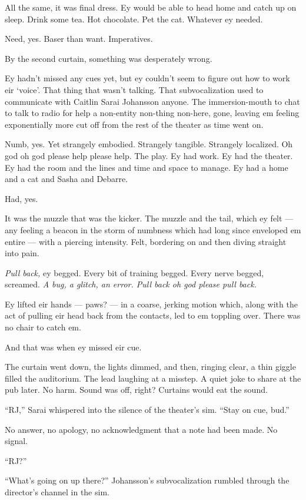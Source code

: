 All the same, it was final dress. Ey would be able to head home and catch up on sleep. Drink some tea. Hot chocolate. Pet the cat. Whatever ey needed.

Need, yes. Baser than want. Imperatives.

By the second curtain, something was desperately wrong.

Ey hadn't missed any cues yet, but ey couldn't seem to figure out how to work eir `voice'. That thing that wasn't talking. That subvocalization used to communicate with Caitlin Sarai Johansson anyone. The immersion-mouth to chat to talk to radio for help a non-entity non-thing non-here, gone, leaving em feeling exponentially more cut off from the rest of the theater as time went on.

Numb, yes. Yet strangely embodied. Strangely tangible. Strangely localized. Oh god oh god please help please help. The play. Ey had work. Ey had the theater. Ey had the room and the lines and time and space to manage. Ey had a home and a cat and Sasha and Debarre.

Had, yes.

It was the muzzle that was the kicker. The muzzle and the tail, which ey felt --- any feeling a beacon in the storm of numbness which had long since enveloped em entire --- with a piercing intensity. Felt, bordering on and then diving straight into pain.

\emph{Pull back,} ey begged. Every bit of training begged. Every nerve begged, screamed. \emph{A bug, a glitch, an error. Pull back oh god please pull back.}

Ey lifted eir hands --- paws? --- in a coarse, jerking motion which, along with the act of pulling eir head back from the contacts, led to em toppling over. There was no chair to catch em.

And that was when ey missed eir cue.

The curtain went down, the lights dimmed, and then, ringing clear, a thin giggle filled the auditorium. The lead laughing at a misstep. A quiet joke to share at the pub later. No harm. Sound was off, right? Curtains would eat the sound.

``RJ,'' Sarai whispered into the silence of the theater's sim. ``Stay on cue, bud.''

No answer, no apology, no acknowledgment that a note had been made. No signal.

``RJ?''

``What's going on up there?'' Johansson's subvocalization rumbled through the director's channel in the sim.

